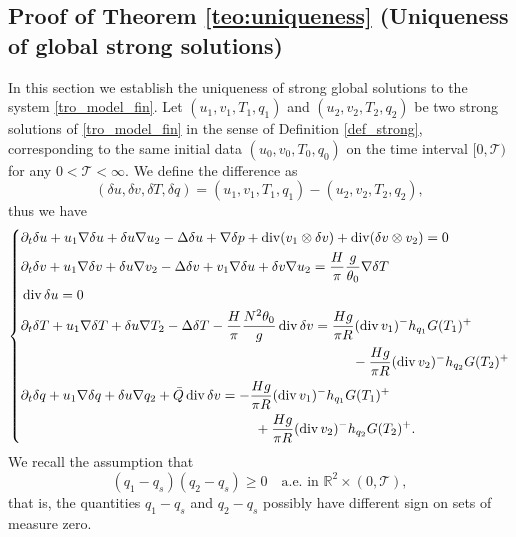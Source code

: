 \documentclass[11pt, a4paper, article,reqno,]{amsart}
\theoremstyle{remark}
\DeclareMathOperator{\dive}{div}
\numberwithin{equation}{section}
\begin{document}
\subsection{Proof of Theorem \ref{teo:uniqueness} (Uniqueness of global strong solutions)}\label{uniqueness}
In this section we establish the uniqueness of strong global solutions to the system \eqref{tro_model_fin}. Let $(u_1,v_1,T_{1},q_1)$ and $(u_2,v_2,T_{2},q_2)$ be two strong solutions of \eqref{tro_model_fin} in the sense of Definition \ref{def_strong}, corresponding to the same initial data $(u_0,v_0,T_{0},q_0)$ on the time interval $[0, \mathcal{T})$ for any $0<\mathcal{T}<\infty$. We define the difference as
\begin{equation*}
    (\delta u, \delta v, \delta T, \delta q)= (u_1,v_1,T_{1},q_1)- (u_2,v_2,T_{2},q_2),
\end{equation*}
thus we have
\begin{equation}\label{eq_diff_sol}
\left\{
    \begin{aligned}
     &\partial_t \delta u + u_1 \nabla \delta u + \delta u \nabla u_2 - \Delta \delta u + \nabla \delta p + \dive (v_1 \otimes \delta v) + \dive (\delta v \otimes v_2) = 0 \\
    &\partial_t \delta v + u_1 \nabla \delta v + \delta u \nabla v_2 - \Delta \delta v + v_1 \nabla \delta u + \delta v \nabla u_2 = \frac{H}{\pi} \frac{g}{\theta_0} \nabla \delta T \\
    &\dive \delta u  = 0 \\
    &\partial_t \delta T + u_1 \nabla \delta T + \delta u \nabla T_{2} - \Delta \delta T - \frac{H}{\pi}\frac{N^2 \theta_0}{g} \dive  \delta v  = \frac{H g}{\pi R}(\dive v_1)^- h_{q_1} G(T_1)^+  \\
    & \hspace{8.5cm}- \frac{H g}{\pi R} (\dive v_2)^- h_{q_2} G(T_2)^+ \\
    &\partial_t \delta q + u_1 \nabla \delta q + \delta u \nabla q_2 + \bar{Q} \dive \delta v  = -  \frac{H g}{\pi R}(\dive v_1)^- h_{q_1}G(T_1)^+ \\
    & \hspace{6cm}+ \frac{H g}{\pi R} (\dive v_2)^- h_{q_2} G(T_2)^+. 
\end{aligned}\right.
\end{equation}
We recall  the assumption that
\begin{equation*}
    (q_1-q_s)(q_2-q_s)\ge 0
\quad \text{a.e. in } \mathbb{R}^2\times(0,\mathcal{T}),
\end{equation*}
that is, the quantities $q_1-q_s$ and $q_2-q_s$ possibly have different sign on sets of measure zero.  
\end{document}
